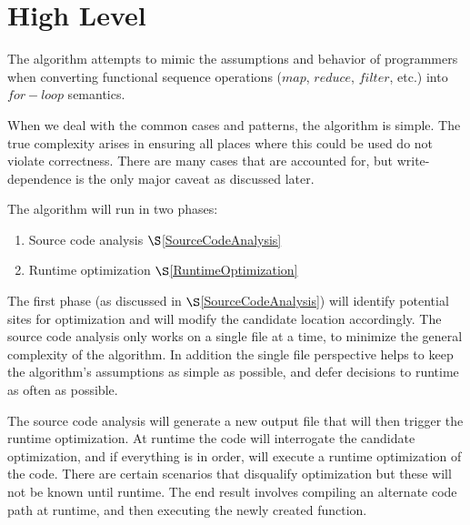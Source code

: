 \section{High Level}
The algorithm attempts to mimic the assumptions and behavior of programmers when converting functional sequence operations ($map$, $reduce$, $filter$, etc.) into $for-loop$ semantics.

When we deal with the common cases and patterns, the algorithm is simple.  The true complexity arises in ensuring all places where this could be used do not violate correctness. There are many cases that are accounted for, but write-dependence is the only major caveat as discussed later.

The algorithm will run in two phases:
  \begin{enumerate}
    \item Source code analysis $\S$\ref{SourceCodeAnalysis}
    \item Runtime optimization $\S$\ref{RuntimeOptimization}
  \end{enumerate}

The first phase (as discussed in $\S$\ref{SourceCodeAnalysis}) will identify potential sites for optimization and will modify the candidate location accordingly.  The source code analysis only works on a single file at a time, to minimize the general complexity of the algorithm. In addition the single file perspective helps to keep the algorithm's assumptions as simple as possible, and defer decisions to runtime as often as possible.

The source code analysis will generate a new output file that will then trigger the runtime optimization.  At runtime the code will interrogate the candidate optimization, and if everything is in order, will execute a runtime optimization of the code. There are certain scenarios that disqualify optimization but these will not be known until runtime.  The end result involves compiling an alternate code path at runtime, and then executing the newly created function.  